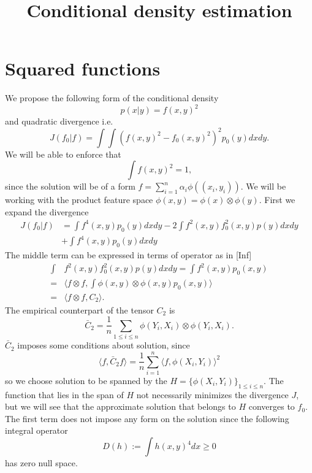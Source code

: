 \documentclass[10pt]{article}
\title{Conditional density estimation}
\begin{document}
\maketitle

\begin{abstract}
\end{abstract}



\section{Squared functions}
We propose the following form of the conditional density 
\begin{equation}
 p(x|y) = f(x,y)^2
\end{equation}
and quadratic  divergence i.e.
\begin{equation}
 J(f_0|f) = \int \int (f(x,y)^2 - f_0(x,y)^2)^2 p_0(y) dx dy. 
\end{equation}
We will be able to enforce that 
\begin{equation}
\int f(x,y)^2 =1,  
\end{equation}
since the solution will be of a form $f = \sum_{i=1}^n \alpha_i \phi((x_i,y_i))$. We will be working with the product feature space  $\phi(x,y) = \phi(x) \otimes \phi(y)$. First we expand the divergence
\begin{align}
 J(f_0|f) &= \int f^4(x,y) p_0(y) dx dy - 2 \int f^2(x,y) f_0^2(x,y) p(y) dx dy  \\
 &+ \int f^4(x,y) p_0(y) dx dy 
\end{align}
The middle term can be expressed in terms of operator as in [Inf] 
\begin{align}
\int &f^2(x,y) f_0^2(x,y) p(y) dx dy = \int f^2(x,y) p_0(x,y) \\
 =&  \langle f \otimes f  , \int \phi(x,y) \otimes \phi(x,y) p_0(x,y) \rangle \\
 =& \langle f \otimes f  , C_2 \rangle.
\end{align}
The empirical counterpart of the tensor $C_2$ is
\begin{equation}
 \bar C_2 = \frac 1 n \sum_{1 \leq i \leq n } \phi(Y_{i},X_{i}) \otimes \phi(Y_{i},X_{i}). 
\end{equation}
$\bar C_2$ imposes some conditions about solution, since 
\begin{equation}
 \langle f, \bar C_2 f \rangle = \frac 1 n \sum_{i=1}^n \langle f , \phi(X_i,Y_i) \rangle^2   
\end{equation}
so we choose solution to be spanned by the $H = \{ \phi(X_i,Y_i) \}_{1 \leq i \leq n}$. The function that lies in the span of $H$ not necessarily minimizes the divergence $J$, but we will see that the approximate solution that belongs to $H$ converges to $f_0$. The first term does not impose any form on the solution since the following integral operator
\begin{equation}
 D(h) := \int h(x,y)^4 dx \geq 0
\end{equation}
has zero null space.
\end{document}
